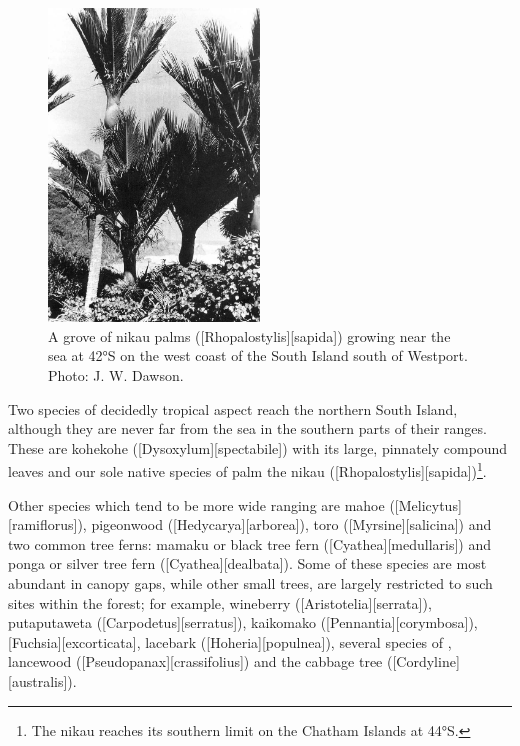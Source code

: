 \begin{figure}
	\includegraphics[width=0.5\textwidth]{graphics/figure60nikau.jpg}
	\centering
	\caption[A grove of nikau palms]{A grove of nikau palms ([Rhopalostylis][sapida]) growing near the sea at 42°S on the west coast of the South Island south of Westport. Photo:  J. W. Dawson.}%
	\label{fig:60nikau}
\end{figure}

Two species of decidedly tropical aspect reach the northern South Island, although they are never far from the sea in the southern parts of their ranges.
These are kohekohe ([Dysoxylum][spectabile]) with its large, pinnately compound leaves and our sole native species of palm the nikau ([Rhopalostylis][sapida])\footnote{The nikau reaches its southern limit on the Chatham Islands at 44°S.}.

Other species which tend to be more wide ranging are mahoe ([Melicytus][ramiflorus]), pigeonwood ([Hedycarya][arborea]), toro ([Myrsine][salicina]) and two common tree ferns: mamaku or black tree fern ([Cyathea][medullaris]) and ponga or silver tree fern ([Cyathea][dealbata]).
Some of these species are most abundant in canopy gaps, while other small trees, are largely restricted to such sites within the forest; for example, wineberry ([Aristotelia][serrata]), putaputaweta ([Carpodetus][serratus]), kaikomako ([Pennantia][corymbosa]),  [Fuchsia][excorticata], lacebark ([Hoheria][populnea]), several species of , lancewood ([Pseudopanax][crassifolius]) and the cabbage tree ([Cordyline][australis]).

